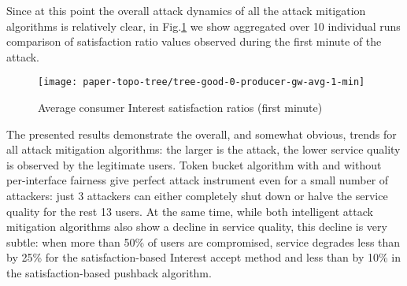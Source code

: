 Since at this point the overall attack dynamics of all the attack mitigation algorithms is relatively clear, in Fig.\ref{fig:small-scale-topo boxplot} we show aggregated over 10 individual runs comparison of satisfaction ratio values observed during the first minute of the attack.

\begin{figure}[htbp]
  \centering
  \texttt{[image: paper-topo-tree/tree-good-0-producer-gw-avg-1-min]}
  \caption{Average consumer Interest satisfaction ratios (first minute)}
  \label{fig:small-scale-topo boxplot}
\end{figure}

The presented results demonstrate the overall, and somewhat obvious, trends for all attack mitigation algorithms: the larger is the attack, the lower service quality is observed by the legitimate users.
Token bucket algorithm with and without per-interface fairness give perfect attack instrument even for a small number of attackers: just 3 attackers can either completely shut down or halve the service quality for the rest 13 users.
At the same time, while both intelligent attack mitigation algorithms also show a decline in service quality, this decline is very subtle: when more than 50\% of users are compromised, service degrades less than by 25\% for the satisfaction-based Interest accept method and less than by 10\% in the satisfaction-based pushback algorithm.




